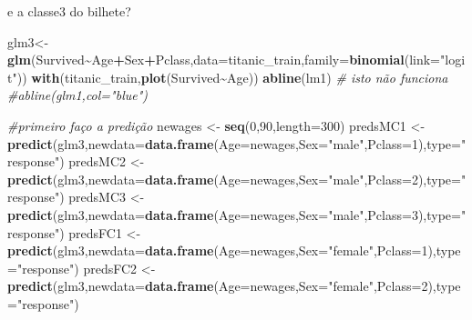 \documentclass[
]{book}
\newenvironment{Shaded}{\begin{snugshade}}{\end{snugshade}}
\newcommand{\AttributeTok}[1]{\textcolor[rgb]{0.13,0.29,0.53}{#1}}
\newcommand{\CommentTok}[1]{\textcolor[rgb]{0.56,0.35,0.01}{\textit{#1}}}
\newcommand{\DecValTok}[1]{\textcolor[rgb]{0.00,0.00,0.81}{#1}}
\newcommand{\FunctionTok}[1]{\textcolor[rgb]{0.13,0.29,0.53}{\textbf{#1}}}
\newcommand{\NormalTok}[1]{#1}
\newcommand{\OtherTok}[1]{\textcolor[rgb]{0.56,0.35,0.01}{#1}}
\newcommand{\SpecialCharTok}[1]{\textcolor[rgb]{0.81,0.36,0.00}{\textbf{#1}}}
\newcommand{\StringTok}[1]{\textcolor[rgb]{0.31,0.60,0.02}{#1}}
\begin{document}
e a classe3 do bilhete?

\begin{Shaded}
\begin{Highlighting}[]
\NormalTok{glm3}\OtherTok{\textless{}{-}}\FunctionTok{glm}\NormalTok{(Survived}\SpecialCharTok{\textasciitilde{}}\NormalTok{Age}\SpecialCharTok{+}\NormalTok{Sex}\SpecialCharTok{+}\NormalTok{Pclass,}\AttributeTok{data=}\NormalTok{titanic\_train,}\AttributeTok{family=}\FunctionTok{binomial}\NormalTok{(}\AttributeTok{link=}\StringTok{"logit"}\NormalTok{))}
\FunctionTok{with}\NormalTok{(titanic\_train,}\FunctionTok{plot}\NormalTok{(Survived}\SpecialCharTok{\textasciitilde{}}\NormalTok{Age))}
\FunctionTok{abline}\NormalTok{(lm1)}
\CommentTok{\# isto não funciona}
\CommentTok{\#abline(glm1,col="blue")}

\CommentTok{\#primeiro faço a predição}
\NormalTok{newages }\OtherTok{\textless{}{-}} \FunctionTok{seq}\NormalTok{(}\DecValTok{0}\NormalTok{,}\DecValTok{90}\NormalTok{,}\AttributeTok{length=}\DecValTok{300}\NormalTok{)}
\NormalTok{predsMC1 }\OtherTok{\textless{}{-}} \FunctionTok{predict}\NormalTok{(glm3,}\AttributeTok{newdata=}\FunctionTok{data.frame}\NormalTok{(}\AttributeTok{Age=}\NormalTok{newages,}\AttributeTok{Sex=}\StringTok{"male"}\NormalTok{,}\AttributeTok{Pclass=}\DecValTok{1}\NormalTok{),}\AttributeTok{type=}\StringTok{"response"}\NormalTok{)}
\NormalTok{predsMC2 }\OtherTok{\textless{}{-}} \FunctionTok{predict}\NormalTok{(glm3,}\AttributeTok{newdata=}\FunctionTok{data.frame}\NormalTok{(}\AttributeTok{Age=}\NormalTok{newages,}\AttributeTok{Sex=}\StringTok{"male"}\NormalTok{,}\AttributeTok{Pclass=}\DecValTok{2}\NormalTok{),}\AttributeTok{type=}\StringTok{"response"}\NormalTok{)}
\NormalTok{predsMC3 }\OtherTok{\textless{}{-}} \FunctionTok{predict}\NormalTok{(glm3,}\AttributeTok{newdata=}\FunctionTok{data.frame}\NormalTok{(}\AttributeTok{Age=}\NormalTok{newages,}\AttributeTok{Sex=}\StringTok{"male"}\NormalTok{,}\AttributeTok{Pclass=}\DecValTok{3}\NormalTok{),}\AttributeTok{type=}\StringTok{"response"}\NormalTok{)}
\NormalTok{predsFC1 }\OtherTok{\textless{}{-}} \FunctionTok{predict}\NormalTok{(glm3,}\AttributeTok{newdata=}\FunctionTok{data.frame}\NormalTok{(}\AttributeTok{Age=}\NormalTok{newages,}\AttributeTok{Sex=}\StringTok{"female"}\NormalTok{,}\AttributeTok{Pclass=}\DecValTok{1}\NormalTok{),}\AttributeTok{type=}\StringTok{"response"}\NormalTok{)}
\NormalTok{predsFC2 }\OtherTok{\textless{}{-}} \FunctionTok{predict}\NormalTok{(glm3,}\AttributeTok{newdata=}\FunctionTok{data.frame}\NormalTok{(}\AttributeTok{Age=}\NormalTok{newages,}\AttributeTok{Sex=}\StringTok{"female"}\NormalTok{,}\AttributeTok{Pclass=}\DecValTok{2}\NormalTok{),}\AttributeTok{type=}\StringTok{"response"}\NormalTok{)}

\end{Highlighting}
\end{Shaded}
\end{document}
